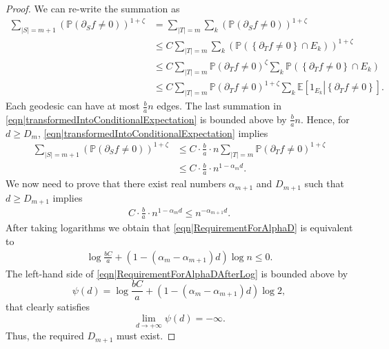 \documentclass[reqno]{amsart}
\begin{document}
 \begin{proof} We can re-write the summation as 
 \begin{align}
 \sum_{|S|=m+1}\left(\mathbb P\left(\partial_Sf\neq 0\right)\right)^{1+\zeta}&=\sum_{|T|=m}\sum_k\left(\mathbb P\left(\partial_Sf\neq 0\right)\right)^{1+\zeta} \nonumber \\
 &\leq C \sum_{|T|=m}\sum_k\left(\mathbb P\left(\left\{\partial_Tf\neq 0\right\}\cap E_k\right)\right)^{1+\zeta} \nonumber \\
 &\leq C \sum_{|T|=m}\mathbb P\left(\partial_Tf\neq 0\right)^{\zeta}\sum_k\mathbb P\left(\left\{\partial_Tf\neq 0\right\}\cap E_k\right)\nonumber 
 \\
  &\leq C \sum_{|T|=m}\mathbb P\left(\partial_Tf\neq 0\right)^{1+\zeta}\sum_k\mathbb E\left[ \left.1_{E_k}\right|\left\{\partial_Tf\neq 0\right\}\right].
  \label{eqn|transformedIntoConditionalExpectation}
 \end{align}
Each geodesic can have at most $\frac ban$ edges. 
 The last summation in \eqref{eqn|transformedIntoConditionalExpectation} is bounded above by $\frac ban$. Hence, for $d\geq D_m$, 
 \eqref{eqn|transformedIntoConditionalExpectation} implies 
 \begin{align}
  \sum_{|S|=m+1}\left(\mathbb P\left(\partial_Sf\neq 0\right)\right)^{1+\zeta}&\leq 
  C\cdot \frac{b}{a}\cdot n\sum_{|T|=m}\mathbb P\left(\partial_Tf\neq 0\right)^{1+\zeta} \nonumber \\ & \leq C\cdot\frac ba\cdot n^{1-\alpha_md}. \quad
  \label{eqn|assumptionApplied}\end{align}
  We now need to prove that there exist real numbers $\alpha_{m+1}$ and $D_{m+1}$ such that $d\geq D_{m+1}$ implies 
  \begin{eqnarray}
  C\cdot\frac ba\cdot n^{1-\alpha_md}\leq n^{-\alpha_{m+1}d}.
  \label{eqn|RequirementForAlphaD}
 \end{eqnarray}
 After taking logarithms we obtain that \eqref{eqn|RequirementForAlphaD} is equivalent to 
\begin{eqnarray}\log\frac{bC}{a} + \left(1-\left(\alpha_m-\alpha_{m+1}\right)d\right)\log n\leq 0.
  \label{eqn|RequirementForAlphaDAfterLog}
\end{eqnarray}
The left-hand side of \eqref{eqn|RequirementForAlphaDAfterLog} is bounded above by 
\[\psi(d)=\log\frac{bC}{a} + \left(1-\left(\alpha_m-\alpha_{m+1}\right)d\right)\log 2,\] that clearly satisfies 
\[\lim_{d\to+\infty}\psi(d)=-\infty.\] Thus, the required $D_{m+1}$ must exist.
 \end{proof}
 
\end{document}
